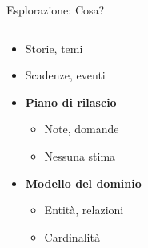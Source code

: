 	\begin{frame}{Esplorazione: Cosa?}

		\begin{columns}[T]
		    \begin{column}{0.6\textwidth}

				\begin{itemize}
					\item Storie, temi
					\item Scadenze, eventi
				\end{itemize}

				\begin{itemize}
					\item \textbf{Piano di rilascio}
					\begin{itemize}
						\item Note, domande
						\item Nessuna stima
					\end{itemize}
					\item \textbf{Modello del dominio}
					\begin{itemize}
						\item Entità, relazioni
						\item Cardinalità
					\end{itemize}
				\end{itemize}
				

\end{column}
\end{columns}
\end{frame}
